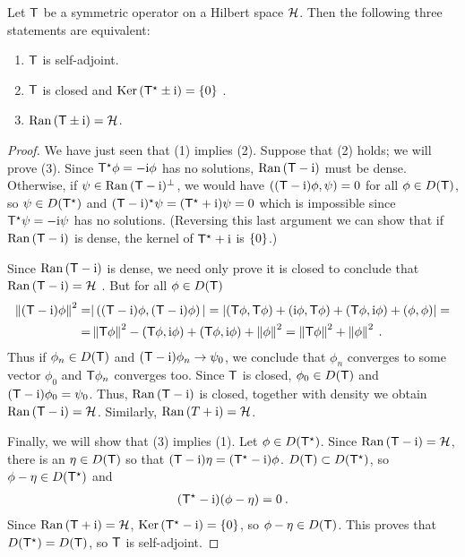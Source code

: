 \begin{theorem}
    Let $\mathsf{T}$ be a symmetric operator on a Hilbert space $\mathcal{H}$. Then the following three statements are equivalent:
    \begin{enumerate}
        \item $\mathsf{T}$ is self-adjoint.
        \item $\mathsf{T}$ is closed and $\mathrm{Ker}\, (\mathsf{T}^\star \pm \mathrm{i}) = \left \lbrace 0 \right \rbrace$ \:.
        \item $\mathrm{Ran}\,(\mathsf{T} \pm \mathrm{i}) = \mathcal{H}$.
    \end{enumerate}
    
\end{theorem}

\begin{proof}
We have just seen that (1) implies (2). Suppose that (2) holds; we will
prove (3). Since $\mathsf{T}^\star \phi = -\mathrm{i} \phi$ has no solutions, $\mathrm{Ran}\, (\mathsf{T}- \mathrm{i}) $ must be dense.
Otherwise, if $\psi \in \mathrm{Ran}\, ( \mathsf{T}- \mathrm{i} )^\bot$, we would have 
\newline
$\left((\mathsf{T}-\mathrm{i}) \phi, \psi \right) =0$ for all $\phi \in D(\mathsf{T})$, so $\psi \in D(\mathsf{T}^\star)$ and $(\mathsf{T} - \mathrm{i})^\star \psi = (\mathsf{T}^\star + \mathrm{i}) \psi = 0$ which is impossible since $\mathsf{T}^\star \psi = - \mathrm{i} \psi $ has no solutions.
(Reversing this last argument we can show that if $\mathrm{Ran}\, ( \mathsf{T} - \mathrm{i})$ is dense, the kernel of $\mathsf{T}^\star + \mathrm{i} $ is $\left \lbrace 0 \right \rbrace$.) 

Since $\mathrm{Ran}\, ( \mathsf{T} - \mathrm{i})$  is dense, we need only prove it is closed to conclude that $\mathrm{Ran}\, ( \mathsf{T} - \mathrm{i}) = \mathcal{H}$ . But for all $\phi \in D(\mathsf{T})$
\begin{align}
    \left \Vert (\mathsf{T} - \mathrm{i}) \phi \right \Vert^2 
    =& |\left((\mathsf{T} - \mathrm{i}) \phi, (\mathsf{T} - \mathrm{i}) \phi  \right)|
    = |(\mathsf{T} \phi, \mathsf{T} \phi) + ( \mathrm{i} \phi, \mathsf{T} \phi) + (\mathsf{T} \phi, \mathrm{i} \phi) + (\phi, \phi)|
    = \\ =& \left \Vert \mathsf{T} \phi \right \Vert^2 - (\mathsf{T} \phi, \mathrm{i} \phi) + (\mathsf{T} \phi, \mathrm{i} \phi)  + \left \Vert \phi \right \Vert^2
    = \left \Vert \mathsf{T} \phi \right \Vert^2 + \left \Vert \phi \right \Vert^2 \:. \nonumber
\end{align}
Thus if $\phi_n \in D(\mathsf{T})$ and $(\mathsf{T} - \mathrm{i}) \phi_n \rightarrow \psi_0$, we conclude that $\phi_n$ converges to some vector $\phi_0$ and $\mathsf{T} \phi_n$ converges too. Since $\mathsf{T}$ is closed, $\phi_0 \in D(\mathsf{T})$ and $(\mathsf{T} - \mathrm{i}) \phi_0 = \psi_0$. Thus, $\mathrm{Ran}\,(\mathsf{T} - \mathrm{i})$ is closed, together with density we obtain $\mathrm{Ran}\, (\mathsf{T} - \mathrm{i}) = \mathcal{H}$. Similarly, $\mathrm{Ran}\,(T+\mathrm{i}) = \mathcal{H}$.

Finally, we will show that (3) implies (1). Let $\phi \in D(\mathsf{T}^\star)$. Since $\mathrm{Ran}\, (\mathsf{T} -\mathrm{i}) = \mathcal{H}$, there is an $\eta \in D(\mathsf{T})$ so that $(\mathsf{T} - \mathrm{i}) \eta = (\mathsf{T}^\star - \mathrm{i}) \phi$. $D(\mathsf{T}) \subset D(\mathsf{T}^\star)$, so $\phi - \eta \in D(\mathsf{T}^\star)$ and \begin{align}
    (\mathsf{T}^\star - \mathrm{i})(\phi - \eta) = 0 \:.
\end{align}
Since $\mathrm{Ran}\,(\mathsf{T} +\mathrm{i} )=\mathcal{H}$, $\mathrm{Ker}\, (\mathsf{T}^\star - \mathrm{i}) = \left \lbrace 0 \right \rbrace$, so $\phi - \eta \in D(\mathsf{T})$. This proves that $D(\mathsf{T}^\star) = D(\mathsf{T})$, so $\mathsf{T}$ is self-adjoint.

\end{proof}

